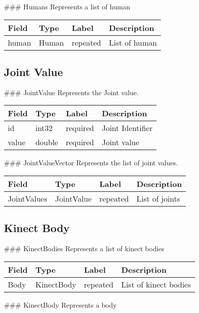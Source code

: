  \#\#\# Humans Represents a list of human

\begin{longtable}[l]{@{}llll@{}}
\toprule
Field & Type & Label & Description\tabularnewline
\midrule
\endhead
human & Human & repeated & List of human\tabularnewline
\bottomrule
\end{longtable}

\subsection{Joint Value}\label{jointux5fvalueux5fmap.proto}

 \#\#\# JointValue Represents the Joint value.

\begin{longtable}[l]{@{}llll@{}}
\toprule
Field & Type & Label & Description\tabularnewline
\midrule
\endhead
id & int32 & required & Joint Identifier\tabularnewline
value & double & required & Joint value\tabularnewline
\bottomrule
\end{longtable}

 \#\#\# JointValueVector Represents the list of joint values.

\begin{longtable}[l]{@{}llll@{}}
\toprule
Field & Type & Label & Description\tabularnewline
\midrule
\endhead
JointValues & JointValue & repeated & List of joints\tabularnewline
\bottomrule
\end{longtable}

 \subsection{Kinect Body}\label{kinectux5fbody.proto}

 \#\#\# KinectBodies Represents a list of kinect bodies

\begin{longtable}[l]{@{}llll@{}}
\toprule
Field & Type & Label & Description\tabularnewline
\midrule
\endhead
Body & KinectBody & repeated & List of kinect bodies\tabularnewline
\bottomrule
\end{longtable}

 \#\#\# KinectBody Represents a body


